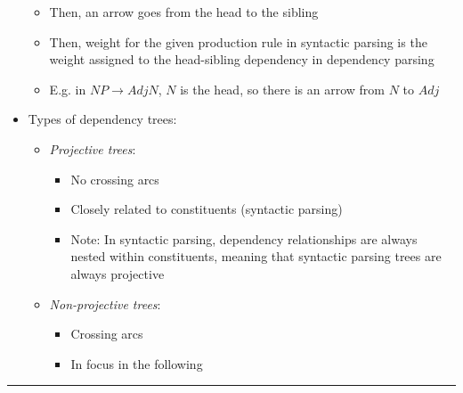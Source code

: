 \begin{itemize}
\begin{itemize}
        \item Then, an arrow goes from the head to the sibling
        \item Then, weight for the given production rule in syntactic parsing is the weight assigned to the head-sibling dependency in dependency parsing
        \item E.g. in $NP \to Adj N$, $N$ is the head, so there is an arrow from $N$ to $Adj$
    \end{itemize}
    \item Types of dependency trees:
    \begin{itemize}
        \item \emph{Projective trees}:
        \begin{itemize}
            \item No crossing arcs
            \item Closely related to constituents (syntactic parsing)
            \item Note: In syntactic parsing, dependency relationships are always nested within constituents, meaning that syntactic parsing trees are always projective
        \end{itemize}
        \item \emph{Non-projective trees}:
        \begin{itemize}
            \item Crossing arcs
            \item In focus in the following
        \end{itemize}
    \end{itemize}
\end{itemize}

{\color{lightgray}\hrule height 0.001mm}

